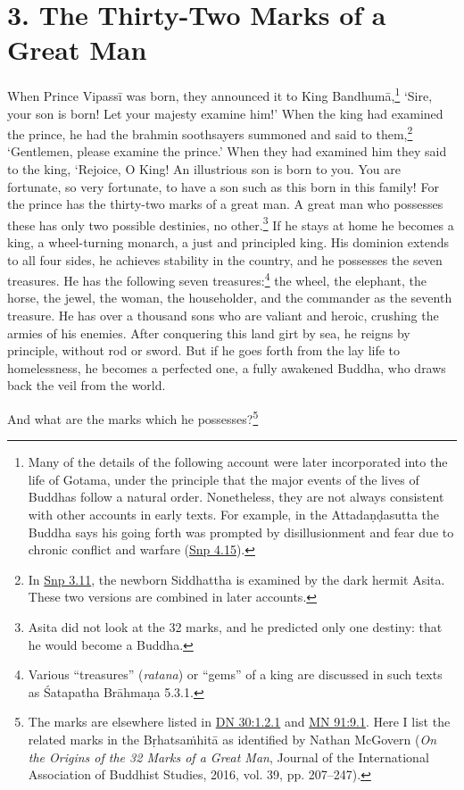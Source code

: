 \documentclass[12pt,openany]{book}%
\begin{document}
\section*{3. The Thirty-Two Marks of a Great Man }

When Prince \textsanskrit{Vipassī} was born, they announced it to King \textsanskrit{Bandhumā},\footnote{Many of the details of the following account were later incorporated into the life of Gotama, under the principle that the major events of the lives of Buddhas follow a natural order. Nonetheless, they are not always consistent with other accounts in early texts. For example, in the \textsanskrit{Attadaṇḍasutta} the Buddha says his going forth was prompted by disillusionment and fear due to chronic conflict and warfare (\href{https://suttacentral.net/snp4.15/en/sujato}{Snp 4.15}). } ‘Sire, your son is born! Let your majesty examine him!’ When the king had examined the prince, he had the brahmin soothsayers summoned and said to them,\footnote{In \href{https://suttacentral.net/snp3.11/en/sujato}{Snp 3.11}, the newborn Siddhattha is examined by the dark hermit Asita. These two versions are combined in later accounts. } ‘Gentlemen, please examine the prince.’ When they had examined him they said to the king, ‘Rejoice, O King! An illustrious son is born to you. You are fortunate, so very fortunate, to have a son such as this born in this family! For the prince has the thirty-two marks of a great man. A great man who possesses these has only two possible destinies, no other.\footnote{Asita did not look at the 32 marks, and he predicted only one destiny: that he would become a Buddha. } If he stays at home he becomes a king, a wheel-turning monarch, a just and principled king. His dominion extends to all four sides, he achieves stability in the country, and he possesses the seven treasures. He has the following seven treasures:\footnote{Various “treasures” (\textit{ratana}) or “gems” of a king are discussed in such texts as Śatapatha \textsanskrit{Brāhmaṇa} 5.3.1. } the wheel, the elephant, the horse, the jewel, the woman, the householder, and the commander as the seventh treasure. He has over a thousand sons who are valiant and heroic, crushing the armies of his enemies. After conquering this land girt by sea, he reigns by principle, without rod or sword. But if he goes forth from the lay life to homelessness, he becomes a perfected one, a fully awakened Buddha, who draws back the veil from the world. 

And what are the marks which he possesses?\footnote{The marks are elsewhere listed in \href{https://suttacentral.net/dn30/en/sujato\#1.2.1}{DN 30:1.2.1} and \href{https://suttacentral.net/mn91/en/sujato\#9.1}{MN 91:9.1}. Here I list the related marks in the \textsanskrit{Bṛhatsaṁhitā} as identified by Nathan McGovern (\emph{On the Origins of the 32 Marks of a Great Man}, Journal of the International Association of Buddhist Studies, 2016, vol. 39, pp. 207–247). } 
\end{document}
